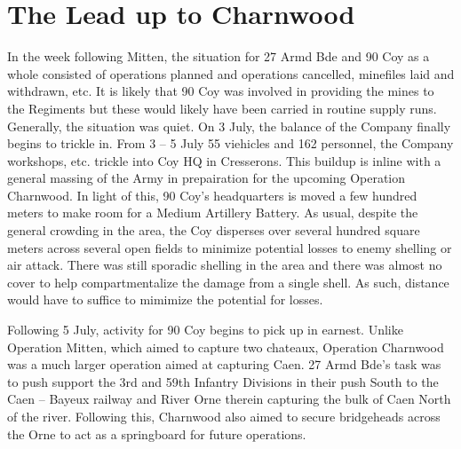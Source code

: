 \documentclass[noraggedright]{turabian-researchpaper}
\begin{document}

\section{The Lead up to Charnwood}

In the week following Mitten, the situation for 27 Armd Bde and 90 Coy as a 
whole consisted of operations planned and operations cancelled, minefiles laid
and withdrawn, etc.  It is likely that 90 Coy was involved in providing the 
mines to the Regiments but these would likely have been carried in routine 
supply runs.  Generally, the situation was quiet.  On 3 July, the balance of
the Company finally begins to trickle in.  From 3 -- 5 July 55 viehicles and
162 personnel, the Company workshops, etc. trickle into Coy HQ in Cresserons.
This buildup is inline with a general massing of the Army in prepairation for
the upcoming Operation Charnwood.  In light of this, 90 Coy's headquarters is
moved a few hundred meters to make room for a Medium Artillery Battery.  As
usual, despite the general crowding in the area, the Coy disperses over several
hundred square meters across several open fields to minimize potential losses
to enemy shelling or air attack.\autocite[1 -- 5 July 1944]{90wd}  
There was still sporadic shelling in the 
area and there was almost no cover to help compartmentalize the damage from a
single shell.\autocite[5 July 1944]{27wd}  As such, distance would have to 
suffice to mimimize the potential for losses.  %

Following 5 July, activity for 90 Coy begins to pick up in earnest.  
Unlike Operation Mitten, which aimed to capture two chateaux,  Operation 
Charnwood was a much larger operation aimed at capturing Caen.  27 Armd Bde's
task was to push support the 3rd and 59th Infantry Divisions in their push 
South to the Caen -- Bayeux railway and River Orne therein capturing the bulk 
of Caen North of the river.  
Following this, Charnwood also aimed to secure bridgeheads 
across the Orne to act as a springboard for future operations.\autocite
[Operation Charnwood, 27th Armoured Brigade Operation Order No 2 (See appendix
to July diary following papers pertaining to Goodwood)]{27wd}
\end{document}
